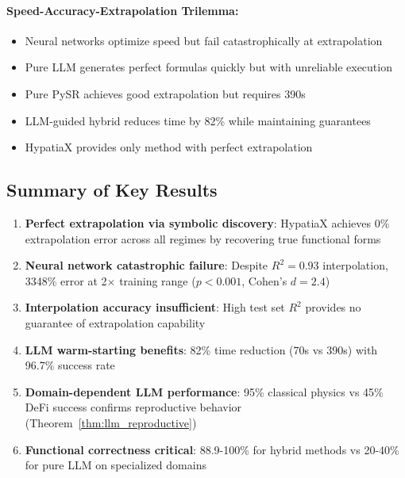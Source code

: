 \paragraph{Speed-Accuracy-Extrapolation Trilemma:}
\begin{itemize}
\item Neural networks optimize speed but fail catastrophically at extrapolation
\item Pure LLM generates perfect formulas quickly but with unreliable execution
\item Pure PySR achieves good extrapolation but requires 390s
\item LLM-guided hybrid reduces time by 82\% while maintaining guarantees
\item HypatiaX provides only method with perfect extrapolation
\end{itemize}

\subsection{Summary of Key Results}

\begin{enumerate}
\item \textbf{Perfect extrapolation via symbolic discovery}: HypatiaX achieves 0\% extrapolation error across all regimes by recovering true functional forms

\item \textbf{Neural network catastrophic failure}: Despite $R^2 = 0.93$ interpolation, 3348\% error at 2$\times$ training range ($p < 0.001$, Cohen's $d = 2.4$)

\item \textbf{Interpolation accuracy insufficient}: High test set $R^2$ provides no guarantee of extrapolation capability

\item \textbf{LLM warm-starting benefits}: 82\% time reduction (70s vs 390s) with 96.7\% success rate

\item \textbf{Domain-dependent LLM performance}: 95\% classical physics vs 45\% DeFi success confirms reproductive behavior (Theorem~\ref{thm:llm_reproductive})

\item \textbf{Functional correctness critical}: 88.9-100\% for hybrid methods vs 20-40\% for pure LLM on specialized domains
\end{enumerate}

